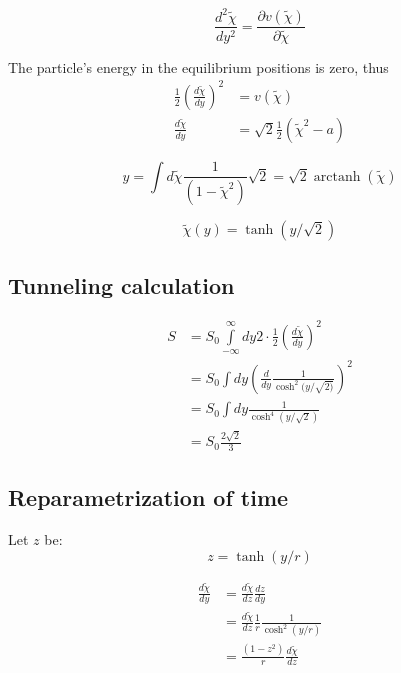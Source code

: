 \documentclass[12pt,a4paper]{article}
\DeclareMathOperator\arctanh{arctanh}
\numberwithin{equation}{section}
\begin{document}
\begin{equation}
\frac{d^2 \tilde{\chi}}{dy^2} = \frac{\partial v(\tilde{\chi})}{\partial \tilde{\chi}}
\end{equation}

The particle's energy in the equilibrium positions is zero, thus
\begin{align}
\nonumber
\frac{1}{2}\left( \frac{d \tilde{\chi}}{d y}\right)^2 &= v(\tilde{\chi}) \\
\frac{d \tilde{\chi}}{d y} &= \sqrt{2} \frac{1}{2} (\tilde{\chi} ^2 -a)
\end{align}

\begin{equation}
y = \int d\tilde{\chi} \frac{1}{(1-\tilde{\chi}^2)}\sqrt{2} = \sqrt{2} \arctanh(\tilde{\chi})
\end{equation}


\begin{equation}
\tilde{\chi}(y) = \tanh(y/ \sqrt{2})
\end{equation}




\subsection{Tunneling calculation}

\begin{align}
S &= S_0 \int\limits_{-\infty}^\infty dy 2\cdot \frac{1}{2} \left( \frac{d \tilde{\chi}}{d y}\right)^2 \nonumber\\
&= S_0 \int dy \left( \frac{d}{dy} \frac{1}{\cosh^2(y/\sqrt{2)}} \right)^2 \nonumber \\
&= S_0 \int dy \frac{1}{\cosh^4 (y/\sqrt{2})}\\
&= S_0 \frac{2 \sqrt{2}}{3} \nonumber
\end{align}

\subsection{Reparametrization of time}

Let $z$ be:
\begin{equation}
z = \tanh(y/r)
\end{equation}

\begin{align}
\frac{d\tilde{\chi}}{dy} &= \frac{d\tilde{\chi}}{dz} \frac{dz}{dy} \nonumber \\
&= \frac{d\tilde{\chi}}{dz} \frac{1}{r}\frac{1}{\cosh^2(y/r)} \nonumber \\
&= \frac{(1-z^2)}{r} \frac{d\tilde{\chi}}{dz}
\end{align}
\end{document}
